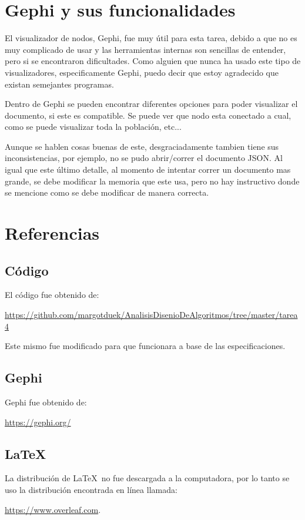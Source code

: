 \documentclass[acmsmall]{acmart}
\begin{document}
\section{Gephi y sus funcionalidades}
El visualizador de nodos, Gephi, fue muy útil para esta tarea, debido a que no es muy complicado de usar y las herramientas internas son sencillas de entender, pero si se encontraron dificultades. Como alguien que nunca ha usado este tipo de visualizadores, especificamente Gephi, puedo decir que estoy agradecido que existan semejantes programas.

Dentro de Gephi se pueden encontrar diferentes opciones para poder visualizar el documento, si este es compatible. Se puede ver que nodo esta conectado a cual, como se puede visualizar toda la población, etc...

Aunque se hablen cosas buenas de este, desgraciadamente tambien tiene sus inconsistencias, por ejemplo, no se pudo abrir/correr el documento JSON. Al igual que este último detalle, al momento de intentar correr un documento mas grande, se debe modificar la memoria que este usa, pero no hay instructivo donde se mencione como se debe modificar de manera correcta.


\section{Referencias}
\subsection{Código}
El código fue obtenido de:
\begin{center}
    \url{https://github.com/margotduek/AnalisisDisenioDeAlgoritmos/tree/master/tarea4}
\end{center}

Este mismo fue modificado para que funcionara a base de las especificaciones.

\subsection{Gephi}
Gephi fue obtenido de:
\begin{center}
    \url{https://gephi.org/}
\end{center}

\subsection{LaTeX}
La distribución de \LaTeX\ no fue descargada a la computadora, por lo tanto se uso la distribución encontrada en línea llamada:

\begin{center}
    \url{https://www.overleaf.com}.
\end{center}
    
\end{document}
